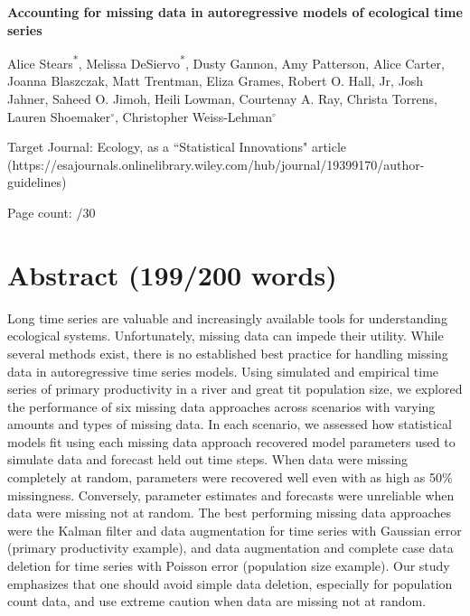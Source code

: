 \documentclass{article}
\begin{document}

{\Large \noindent \bf %
Accounting for missing data in autoregressive models of ecological time series
}

\medskip

\noindent Alice Stears\textsuperscript{*}, 
Melissa DeSiervo\textsuperscript{*},
Dusty Gannon,
Amy Patterson,
Alice Carter,
Joanna Blaszczak,
Matt Trentman,
Eliza Grames,
Robert O. Hall, Jr,
Josh Jahner,
Saheed O. Jimoh,
Heili Lowman, %
Courtenay A. Ray,
Christa Torrens,
Lauren Shoemaker$^{\circ}$,
Christopher Weiss-Lehman$^{\circ}$


\noindent Target Journal: Ecology, as a ``Statistical Innovations" article (https://esajournals.onlinelibrary.wiley.com/hub/journal/19399170/author-guidelines) 

\noindent Page count: \pageref{LastPage}/30

\clearpage


\section*{Abstract (199/200 words)} %
Long time series are valuable and increasingly available tools for understanding ecological systems. Unfortunately, missing data can impede their utility. While several methods exist, there is no established best practice for handling missing data in autoregressive time series models. Using simulated and empirical time series of primary productivity in a river and great tit population size, we explored the performance of six missing data approaches across scenarios with varying amounts and types of missing data. In each scenario, we assessed how statistical models fit using each missing data approach recovered model parameters used to simulate data and forecast held out time steps. When data were missing completely at random, parameters were recovered well even with as high as 50\% missingness. Conversely, parameter estimates and forecasts were unreliable when data were missing not at random. The best performing missing data approaches were the Kalman filter and data augmentation for time series with Gaussian error (primary productivity example), and data augmentation and complete case data deletion for time series with Poisson error (population size example). Our study emphasizes that one should avoid simple data deletion, especially for population count data, and use extreme caution when data are missing not at random.
\end{document}
